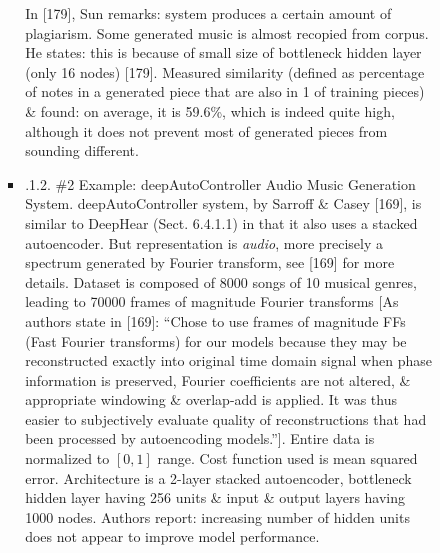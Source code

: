 \documentclass{article}
\begin{document}
\begin{itemize}
\begin{itemize}
\begin{itemize}
\begin{itemize}
				In [179], {\sc Sun} remarks: system produces a certain amount of plagiarism. Some generated music is almost recopied from corpus. He states: this is because of small size of bottleneck hidden layer (only 16 nodes) [179]. Measured similarity (defined as percentage of notes in a generated piece that are also in 1 of training pieces) \& found: on average, it is 59.6\%, which is indeed quite high, although it does not prevent most of generated pieces from sounding different.
				\item {.1.2. \#2 Example: deepAutoController Audio Music Generation System.} deepAutoController system, by {\sc Sarroff \& Casey} [169], is similar to DeepHear (Sect. 6.4.1.1) in that it also uses a stacked autoencoder. But representation is {\it audio}, more precisely a spectrum generated by Fourier transform, see [169] for more details. Dataset is composed of 8000 songs of 10 musical genres, leading to 70000 frames of magnitude Fourier transforms [As authors state in [169]: ``Chose to use frames of magnitude FFs (Fast Fourier transforms) for our models because they may be reconstructed exactly into original time domain signal when phase information is preserved, Fourier coefficients are not altered, \& appropriate windowing \& overlap-add is applied. It was thus easier to subjectively evaluate quality of reconstructions that had been processed by autoencoding models.'']. Entire data is normalized to $[0,1]$ range. Cost function used is mean squared error. Architecture is a 2-layer stacked autoencoder, bottleneck hidden layer having 256 units \& input \& output layers having 1000 nodes. Authors report: increasing number of hidden units does not appear to improve model performance.
				

\end{itemize}
\end{itemize}
\end{itemize}
\end{itemize}
\end{document}
